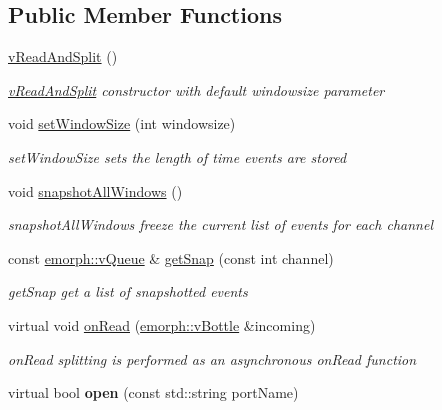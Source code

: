 \subsection*{Public Member Functions}
\begin{DoxyCompactItemize}
\item 
\hypertarget{classemorph_1_1vReadAndSplit_a58ed7a0a18a7c11a5d997c8deec0bd3d}{\hyperlink{classemorph_1_1vReadAndSplit_a58ed7a0a18a7c11a5d997c8deec0bd3d}{v\-Read\-And\-Split} ()}\label{classemorph_1_1vReadAndSplit_a58ed7a0a18a7c11a5d997c8deec0bd3d}

\begin{DoxyCompactList}\small\item\em \hyperlink{classemorph_1_1vReadAndSplit}{v\-Read\-And\-Split} constructor with default windowsize parameter \end{DoxyCompactList}\item 
void \hyperlink{classemorph_1_1vReadAndSplit_ab59e77834ba842a6508b174c48b5cda2}{set\-Window\-Size} (int windowsize)
\begin{DoxyCompactList}\small\item\em set\-Window\-Size sets the length of time events are stored \end{DoxyCompactList}\item 
\hypertarget{classemorph_1_1vReadAndSplit_a39e2a1c330b7b2bde69544183219a0fa}{void \hyperlink{classemorph_1_1vReadAndSplit_a39e2a1c330b7b2bde69544183219a0fa}{snapshot\-All\-Windows} ()}\label{classemorph_1_1vReadAndSplit_a39e2a1c330b7b2bde69544183219a0fa}

\begin{DoxyCompactList}\small\item\em snapshot\-All\-Windows freeze the current list of events for each channel \end{DoxyCompactList}\item 
const \hyperlink{classemorph_1_1vQueue}{emorph\-::v\-Queue} \& \hyperlink{classemorph_1_1vReadAndSplit_a47fa3402c835dfb703090cce063d472f}{get\-Snap} (const int channel)
\begin{DoxyCompactList}\small\item\em get\-Snap get a list of snapshotted events \end{DoxyCompactList}\item 
virtual void \hyperlink{classemorph_1_1vReadAndSplit_a1d8534ca9c14f84159546d9d2fb6fd75}{on\-Read} (\hyperlink{classemorph_1_1vBottle}{emorph\-::v\-Bottle} \&incoming)
\begin{DoxyCompactList}\small\item\em on\-Read splitting is performed as an asynchronous on\-Read function \end{DoxyCompactList}\item 
\hypertarget{classemorph_1_1vReadAndSplit_a1896b51ae1e8c9d13d875d37c2319b97}{virtual bool {\bfseries open} (const std\-::string port\-Name)}\label{classemorph_1_1vReadAndSplit_a1896b51ae1e8c9d13d875d37c2319b97}

\end{DoxyCompactItemize}


